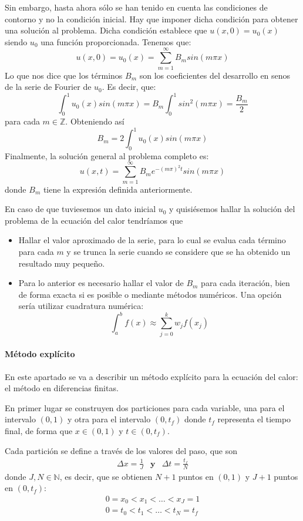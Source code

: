 Sin embargo, hasta ahora sólo se han tenido en cuenta las condiciones de contorno y no la condición inicial. Hay que imponer dicha condición para obtener una solución al problema. Dicha condición establece que $u(x,0) = u_0(x)$ siendo $u_0$ una función proporcionada.
Tenemos que:
$$u(x,0) = u_0(x) = \sum_{m=1}^\infty B_m sin(m\pi x)$$
Lo que nos dice que los términos $B_m$ son los coeficientes del desarrollo en senos de la serie de Fourier de $u_0$.
Es decir, que:
$$\int_0^1 u_0(x) sin(m\pi x) = B_m \int_0^1 sin^2(m\pi x) = \frac{B_m}{2}$$ para cada $m\in\mathbb{Z}$. Obteniendo así $$B_m = 2\int_0^1 u_0(x) sin(m\pi x)$$
Finalmente, la solución general al problema completo es:
$$u(x,t) = \sum_{m=1}^\infty B_m e^{-(m\pi)^2 t} sin(m\pi x)$$ donde $B_m$ tiene la expresión definida anteriormente.

En caso de que tuviesemos un dato inicial $u_0$ y quisiésemos hallar la solución del problema de la ecuación del calor tendríamos que

\begin{itemize}
	\item Hallar el valor aproximado de la serie, para lo cual se evalua cada término para cada $m$ y se trunca la serie cuando se considere que se ha obtenido un resultado muy pequeño.
	\item Para lo anterior es necesario hallar el valor de $B_m$ para cada iteración, bien de forma exacta si es posible o mediante métodos numéricos. Una opción sería utilizar cuadratura numérica:
	$$\int_a^b f(x) \approx \sum_{j=0}^k w_j f(x_j)$$
\end{itemize}

\paragraph{Método explícito}
En este apartado se va a describir un método explícito para la ecuación del calor: el método en diferencias finitas.

En primer lugar se construyen dos particiones para cada variable, una para el intervalo $(0,1)$ y otra para el intervalo $(0,t_f)$ donde $t_f$ representa el tiempo final, de forma que $x\in(0,1)$ y $t\in(0,t_f)$.

Cada partición se define a través de los valores del paso, que son
\begin{equation*}
	\begin{array}{lll}
		\Delta x = \frac{1}{J}& \textbf{y} & \Delta t = \frac{t_f}{N}
	\end{array}
\end{equation*}
donde $J,N\in\mathbb{N}$, es decir, que se obtienen $N+1$ puntos en $(0,1)$ y $J+1$ puntos en $(0,t_f)$:
\begin{align*}
0=x_0<x_1<\hdots<x_J = 1\\
0=t_0<t_1<\hdots<t_N = t_f
\end{align*}

